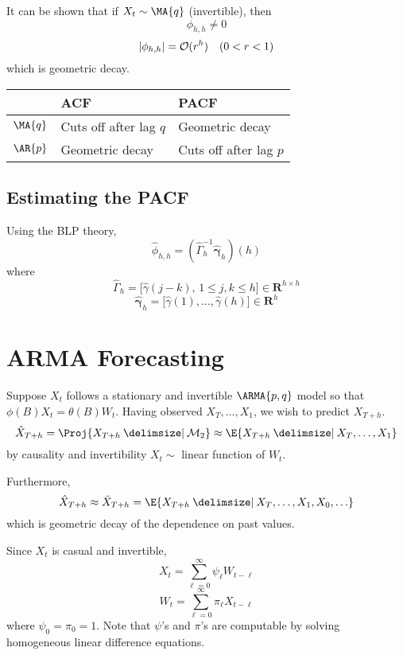\begin{Remark}{}{}
    It can be shown that if $ X_t \sim \MA{q} $ (invertible), then
    \[ \phi_{h,h}\ne 0 \]
    \[ \lvert\phi_{h,h}\rvert=\mathcal{O}(r^h)\quad(0<r<1) \]
    which is geometric decay.
    \begin{center}
        \begin{tabularx}{0.5\linewidth}{@{}YYY@{}}
                       & ACF                      & PACF                     \\
            \midrule
            $ \MA{q} $ & Cuts off after lag $ q $ & Geometric decay          \\
            $ \AR{p} $ & Geometric decay          & Cuts off after lag $ p $
        \end{tabularx}
    \end{center}
\end{Remark}
\subsection*{Estimating the PACF}
Using the BLP theory,
\[ \hat{\phi}_{h,h}=(\hat{\Gamma}_h^{-1}\hat{\symbf{\gamma}}_h)(h) \]
where
\[ \hat{\Gamma}_h=\bigl[\hat{\gamma}(j-k),\, 1\le j,k\le h\bigr]\in\mathbf{R}^{h\times h} \]
\[ \hat{\symbf{\gamma}}_h=\bigl[\hat{\gamma}(1),\ldots,\hat{\gamma}(h)\bigr]\in\mathbf{R}^h \]
\section{ARMA Forecasting}
Suppose $ X_t $ follows a stationary and invertible $ \ARMA{p,q} $
model so that $ \phi(B)X_t=\theta(B)W_t $. Having observed
$ X_T,\ldots,X_1 $, we wish to predict $ X_{T+h} $.
\[ \hat{X}_{T+h}=\Proj{X_{T+h}\onto \mathcal{M}_2}\approx \E{X_{T+h}\given X_{T},\ldots,X_1} \]
by causality and invertibility $ X_t \sim $ linear function of $ W_t $.

Furthermore,
\[ \hat{X}_{T+h}\approx \tilde{X}_{T+h}=\E{X_{T+h}\given X_{T},\ldots,X_1,X_0,\ldots} \]
which is geometric decay of the dependence on past values.

Since $ X_t $ is casual and invertible,
\[ X_t=\sum_{\ell=0}^{\infty} \psi_\ell W_{t-\ell} \]
\[ W_t=\sum_{\ell=0}^{\infty} \pi_\ell X_{t-\ell} \]
where $ \psi_0=\pi_0=1 $. Note that
$ \psi $'s and $ \pi $'s are computable by solving homogeneous
linear difference equations.

